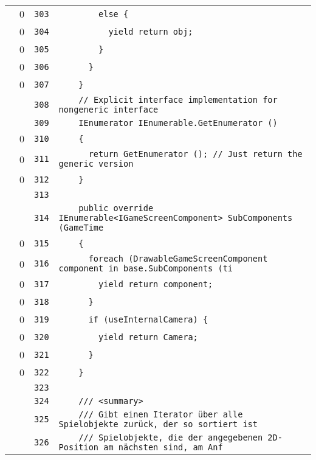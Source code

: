 \documentclass[a4paper,10pt]{article}
\begin{document}
\begin{longtable}[l]{lrrl}
\cellcolor{red} & 0 & \verb~303~ & \verb~        else {~\\
\cellcolor{red} & 0 & \verb~304~ & \verb~          yield return obj;~\\
\cellcolor{red} & 0 & \verb~305~ & \verb~        }~\\
\cellcolor{red} & 0 & \verb~306~ & \verb~      }~\\
\cellcolor{red} & 0 & \verb~307~ & \verb~    }~\\
\cellcolor{gray} &  & \verb~308~ & \verb~    // Explicit interface implementation for nongeneric interface~\\
\cellcolor{gray} &  & \verb~309~ & \verb~    IEnumerator IEnumerable.GetEnumerator ()~\\
\cellcolor{red} & 0 & \verb~310~ & \verb~    {~\\
\cellcolor{red} & 0 & \verb~311~ & \verb~      return GetEnumerator (); // Just return the generic version~\\
\cellcolor{red} & 0 & \verb~312~ & \verb~    }~\\
\cellcolor{gray} &  & \verb~313~ & \verb~~\\
\cellcolor{gray} &  & \verb~314~ & \verb~    public override IEnumerable<IGameScreenComponent> SubComponents (GameTime ~\\
\cellcolor{red} & 0 & \verb~315~ & \verb~    {~\\
\cellcolor{red} & 0 & \verb~316~ & \verb~      foreach (DrawableGameScreenComponent component in base.SubComponents (ti~\\
\cellcolor{red} & 0 & \verb~317~ & \verb~        yield return component;~\\
\cellcolor{red} & 0 & \verb~318~ & \verb~      }~\\
\cellcolor{red} & 0 & \verb~319~ & \verb~      if (useInternalCamera) {~\\
\cellcolor{red} & 0 & \verb~320~ & \verb~        yield return Camera;~\\
\cellcolor{red} & 0 & \verb~321~ & \verb~      }~\\
\cellcolor{red} & 0 & \verb~322~ & \verb~    }~\\
\cellcolor{gray} &  & \verb~323~ & \verb~~\\
\cellcolor{gray} &  & \verb~324~ & \verb~    /// <summary>~\\
\cellcolor{gray} &  & \verb~325~ & \verb~    /// Gibt einen Iterator über alle Spielobjekte zurück, der so sortiert ist~\\
\cellcolor{gray} &  & \verb~326~ & \verb~    /// Spielobjekte, die der angegebenen 2D-Position am nächsten sind, am Anf~\\

\end{longtable}
\end{document}
